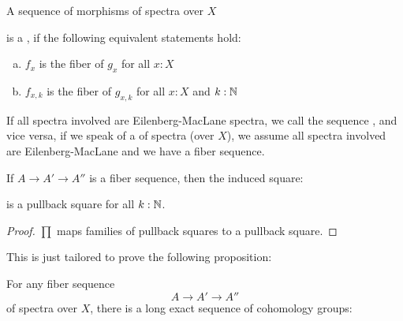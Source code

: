 \begin{definition}
  A sequence of morphisms of spectra over $X$
  \begin{center}
  \end{center}
  is a , if the following equivalent statements hold:
  \begin{enumerate}[(a)]
  \item $f_x$ is the fiber of $g_x$ for all $x:X$
  \item $f_{x,k}$ is the fiber of $g_{x,k}$ for all $x:X$ and $k:\mathbb{N}$
  \end{enumerate}
  If all spectra involved are Eilenberg-MacLane spectra, we call the sequence , and vice versa,
  if we speak of a  of spectra (over $X$), we assume all spectra involved are Eilenberg-MacLane and we have a fiber sequence.
\end{definition}

\begin{lemma}
  If $A\to A'\to A''$ is a fiber sequence, then the induced square:
  \begin{center}
  \end{center}
  is a pullback square for all $k:\mathbb{N}$.
\end{lemma}
\begin{proof}
  $\prod$ maps families of pullback squares to a pullback square.
\end{proof}

This is just tailored to prove the following proposition:

\begin{proposition}
  For any fiber sequence
  \[ A\to A'\to A'' \]
  of spectra over $X$, there is a long exact sequence of cohomology groups:
  \begin{center}
  \end{center}
\end{proposition}

